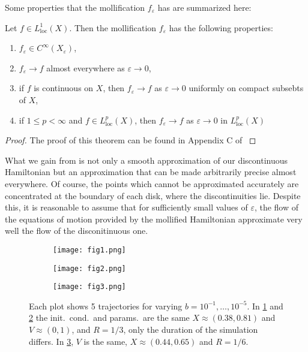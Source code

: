 Some properties that the mollification $f_\varepsilon$ has are summarized here:
\begin{theorem}\label{thm:mollification}
Let $f\in L_{\text{loc}}^1(X)$. Then the mollification $f_\varepsilon$ has the following properties:
\begin{enumerate}
\item $f_\varepsilon\in C^\infty(X_\varepsilon)$,
\item $f_\varepsilon\to f$ almost everywhere as $\varepsilon\to0$,
\item if $f$ is continuous on $X$, then $f_\varepsilon\to f$ as $\varepsilon\to0$ uniformly on compact subsebts of $X$,
\item if $1\le p <\infty$ and $f\in L_{\text{loc}}^p(X)$, then $f_\varepsilon\to f$ as $\varepsilon\to 0$ in $L_{\text{loc}}^p(X)$
\end{enumerate}
\end{theorem}
\begin{proof}
The proof of this theorem can be found in Appendix C of \cite{Evans_1998}
\end{proof}

What we gain from  is not only a smooth approximation of our discontinuous Hamiltonian but an approximation that can be made arbitrarily precise almost everywhere. Of course, the points which cannot be approximated accurately are concentrated at the boundary of each disk, where the discontinuities lie. Despite this, it is reasonable to assume that for sufficiently small values of $\varepsilon$, the flow of the equations of motion provided by the mollified Hamiltonian approximate very well the flow of the disconitinuous one.

\begin{figure}[!th]
\centering
\hfill
\begin{subfigure}[t]{0.30\textwidth}
\centering
\texttt{[image: fig1.png]}
\caption{}
\label{subfig:weakcomparisonA}
\end{subfigure}
\hfill
\begin{subfigure}[t]{0.30\textwidth}
\centering
\texttt{[image: fig2.png]}
\caption{}
\label{subfig:weakcomparisonB}
\end{subfigure}
\hfill
\begin{subfigure}[t]{0.30\textwidth}
\centering
\texttt{[image: fig3.png]}
\caption{}
\label{subfig:weakcomparisonC}
\end{subfigure}
\hfill
\caption{Each plot shows 5 trajectories for varying $b=10^{-1},\dots,10^{-5}$. In \cref{subfig:weakcomparisonA} and \cref{subfig:weakcomparisonB} the init.~cond.~and params.~are the same $X\approx(0.38,0.81)$ and $V\approx(0,1)$, and $R=1/3$, only the duration of the simulation differs. In \cref{subfig:weakcomparisonC}, $V$ is the same, $X \approx(0.44,0.65)$ and $R=1/6$.}
\label{fig:weakcomparison}
\end{figure}

